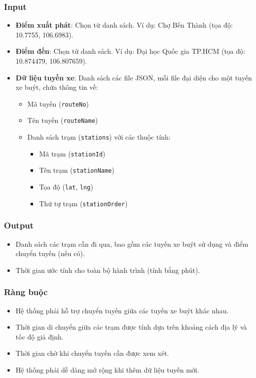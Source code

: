 \documentclass[a4paper,12pt]{article}
\begin{document}
\subsubsection{Input}
\begin{itemize}
    \item \textbf{Điểm xuất phát}: Chọn từ danh sách. Ví dụ: Chợ Bến Thành (tọa độ: 10.7755, 106.6983).
    \item \textbf{Điểm đến}: Chọn từ danh sách. Ví dụ: Đại học Quốc gia TP.HCM (tọa độ: 10.874479, 106.807659).
    \item \textbf{Dữ liệu tuyến xe}: Danh sách các file JSON, mỗi file đại diện cho một tuyến xe buýt, chứa thông tin về:
    \begin{itemize}
        \item Mã tuyến (\texttt{routeNo})
        \item Tên tuyến (\texttt{routeName})
        \item Danh sách trạm (\texttt{stations}) với các thuộc tính:
        \begin{itemize}
            \item Mã trạm (\texttt{stationId})
            \item Tên trạm (\texttt{stationName})
            \item Tọa độ (\texttt{lat}, \texttt{lng})
            \item Thứ tự trạm (\texttt{stationOrder})
        \end{itemize}
    \end{itemize}
\end{itemize}

\subsubsection{Output}
\begin{itemize}
    \item Danh sách các trạm cần đi qua, bao gồm các tuyến xe buýt sử dụng và điểm chuyển tuyến (nếu có).
    \item Thời gian ước tính cho toàn bộ hành trình (tính bằng phút).
\end{itemize}

\subsubsection{Ràng buộc}
\begin{itemize}
    \item Hệ thống phải hỗ trợ chuyển tuyến giữa các tuyến xe buýt khác nhau.
    \item Thời gian di chuyển giữa các trạm được tính dựa trên khoảng cách địa lý và tốc độ giả định.
    \item Thời gian chờ khi chuyển tuyến cần được xem xét.
    \item Hệ thống phải dễ dàng mở rộng khi thêm dữ liệu tuyến mới.
\end{itemize}
\end{document}
